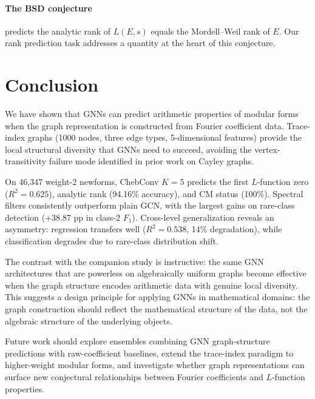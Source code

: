\documentclass[11pt]{article}
\begin{document}
\paragraph{The BSD conjecture \citep{bsd1965}} predicts the analytic rank of $L(E,s)$ equals the Mordell--Weil rank of $E$. Our rank prediction task addresses a quantity at the heart of this conjecture.

\section{Conclusion}
\label{sec:conclusion}

We have shown that GNNs can predict arithmetic properties of modular forms when the graph representation is constructed from Fourier coefficient data. Trace-index graphs (1000 nodes, three edge types, 5-dimensional features) provide the local structural diversity that GNNs need to succeed, avoiding the vertex-transitivity failure mode identified in prior work on Cayley graphs.

On 46,347 weight-2 newforms, ChebConv $K=5$ predicts the first $L$-function zero ($R^2 = 0.625$), analytic rank (94.16\% accuracy), and CM status (100\%). Spectral filters consistently outperform plain GCN, with the largest gains on rare-class detection ($+38.87$ pp in class-2 $F_1$). Cross-level generalization reveals an asymmetry: regression transfers well ($R^2 = 0.538$, 14\% degradation), while classification degrades due to rare-class distribution shift.

The contrast with the companion study is instructive: the same GNN architectures that are powerless on algebraically uniform graphs become effective when the graph structure encodes arithmetic data with genuine local diversity. This suggests a design principle for applying GNNs in mathematical domains: the graph construction should reflect the mathematical structure of the data, not the algebraic structure of the underlying objects.

Future work should explore ensembles combining GNN graph-structure predictions with raw-coefficient baselines, extend the trace-index paradigm to higher-weight modular forms, and investigate whether graph representations can surface new conjectural relationships between Fourier coefficients and $L$-function properties.



\end{document}
